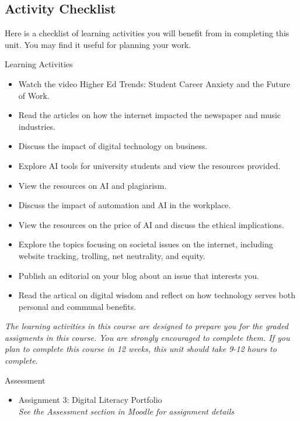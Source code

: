 \documentclass[
]{book}
\providecommand{\tightlist}{%
  \setlength{\itemsep}{0pt}\setlength{\parskip}{0pt}}
\theoremstyle{definition}
\theoremstyle{definition}
\theoremstyle{definition}
\theoremstyle{definition}
\theoremstyle{remark}
\begin{document}
\hypertarget{activity-checklist-5}{%
\subsection*{Activity Checklist}\label{activity-checklist-5}}

Here is a checklist of learning activities you will benefit from in completing this unit. You may find it useful for planning your work.

\begin{reflect}
{Learning Activities}

\begin{itemize}
\tightlist
\item
  Watch the video Higher Ed Trends: Student Career Anxiety and the Future of Work.
\item
  Read the articles on how the internet impacted the newspaper and music industries.
\item
  Discuss the impact of digital technology on business.
\item
  Explore AI tools for university students and view the resources provided.
\item
  View the resources on AI and plagiarism.
\item
  Discuss the impact of automation and AI in the workplace.
\item
  View the resources on the price of AI and discuss the ethical implications.
\item
  Explore the topics focusing on societal issues on the internet, including website tracking, trolling, net neutrality, and equity.
\item
  Publish an editorial on your blog about an issue that interests you.
\item
  Read the artical on digital wisdom and reflect on how technology serves both personal and communal benefits.
\end{itemize}

\emph{The learning activities in this course are designed to prepare you for the graded assigments in this course. You are strongly encouraged to complete them.
If you plan to complete this course in 12 weeks, this unit should take 9-12 hours to complete.}
\end{reflect}

\begin{assessment}
{Assessment}

\begin{itemize}
\tightlist
\item
  Assignment 3: Digital Literacy Portfolio\\
  \emph{See the Assessment section in Moodle for assignment details}
\end{itemize}
\end{assessment}
\end{document}
